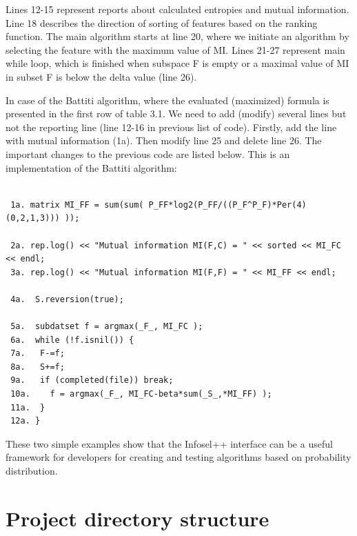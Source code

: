 \documentclass[a4paper,fleqn]{report}
\begin{document}
%
Lines 12-15 represent reports about calculated entropies and mutual information. Line 18 describes the direction of sorting of features
based on the ranking function. The main algorithm starts at line 20, where we initiate an algorithm by selecting the feature 
with the maximum value of MI.
Lines 21-27 represent main while loop, which is finished when subspace F is empty or a maximal value of MI in subset F is below the delta value (line 26).

In case of the Battiti \cite{Battiti1994} algorithm, where the evaluated (maximized) formula is presented in the first row of table 3.1. %
We need to add (modify) several lines but not the reporting line (line 12-16 in previous list of code). Firstly, add the line with mutual information (1a). 
Then modify line 25 and delete line 26. The important changes to the previous code are listed below. This is an implementation of the Battiti algorithm:

{\scriptsize
\begin{verbatim}

 1a. matrix MI_FF = sum(sum( P_FF*log2(P_FF/((P_F^P_F)*Per(4)(0,2,1,3))) ));
 
 2a. rep.log() << "Mutual information MI(F,C) = " << sorted << MI_FC << endl;
 3a. rep.log() << "Mutual information MI(F,F) = " << MI_FF << endl;

 4a.  S.reversion(true);

 5a.  subdatset f = argmax(_F_, MI_FC );
 6a.  while (!f.isnil()) {
 7a.   F-=f;
 8a.   S+=f;
 9a.   if (completed(file)) break;
 10a.    f = argmax(_F_, MI_FC-beta*sum(_S_,*MI_FF) );
 11a.  }
 12a. }
\end{verbatim}
}

These two simple examples show that the Infosel++ interface can be a useful framework for developers for creating and testing 
algorithms based on probability distribution.




\appendix


\chapter{Project directory structure} \label{sec:InfoselDirStr}
\end{document}
